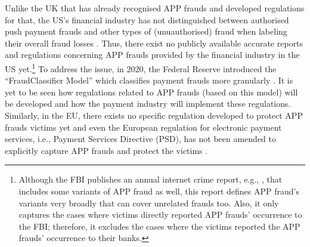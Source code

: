 Unlike the UK that has already recognised APP frauds and developed regulations for that,  the US's financial industry has not distinguished between authorised push payment frauds and other types of (unuauthorised) fraud when labeling their overall fraud losses \cite{P20-report}. Thus, there exist no publicly available accurate reports and regulations concerning APP frauds provided by the financial industry in the US yet.\footnote{Although the FBI publishes  an annual internet crime report, e.g.,  \cite{internet-crime-report}, that includes some variants of APP fraud as well,  this report defines APP fraud's variants very broadly that can cover unrelated frauds too.  Also, it only captures the cases where victims directly reported  APP frauds' occurrence to the FBI; therefore, it excludes the cases where the victims reported the APP frauds' occurrence to their banks.}  To address the issue, in 2020, the Federal Reserve introduced the ``FraudClassifier Model'' which classifies payment frauds more granularly \cite{Fraud-Classifier}. It is yet to be seen how  regulations related to APP frauds (based on this model) will be developed and how the payment industry will implement these regulations. Similarly, in the EU, there  exists no specific regulation developed to protect APP frauds victims yet and even the European regulation for electronic payment services, i.e., Payment Services Directive  (PSD),  has not been amended to explicitly capture APP frauds and protect the victims \cite{kjorven2020pays,McIlroy2021}.














